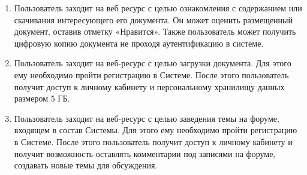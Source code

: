 \documentclass[a4paper,14pt]{extarticle}
\begin{document}
\begin{enumerate}
	\item Пользователь заходит на веб ресурс с целью ознакомления с содержанием или скачивания интересующего его документа. Он может оценить размещенный документ, оставив отметку «Нравится». Также пользователь может получить цифровую копию документа не проходя аутентификацию в системе. 
	\item Пользователь заходит на веб-ресурс с целью загрузки документа. Для этого ему необходимо пройти регистрацию в Системе. После этого пользователь получит доступ к личному кабинету и персональному хранилищу данных размером 5 ГБ.
	\item Пользователь заходит на веб-ресурс с целью заведения темы на форуме, входящем в состав Системы. Для этого ему необходимо пройти регистрацию в Системе. После этого пользователь получит доступ к личному кабинету и получит возможность оставлять комментарии под записями на форуме, создавать новые темы для обсуждения.
\end{enumerate}
\end{document}
